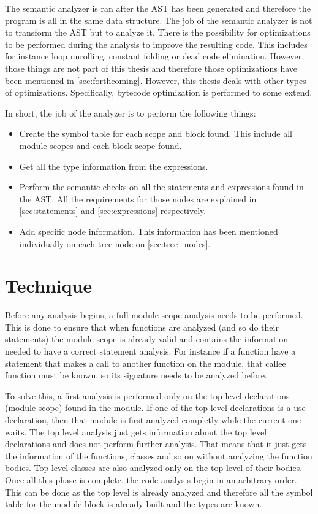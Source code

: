 The semantic analyzer is ran after the AST has been generated and therefore the program is all in
the same data structure. The job of the semantic analyzer is not to transform the AST but to analyze it.
There is the possibility for optimizations to be performed during the analysis to improve the resulting code.
This includes for instance loop unrolling, constant folding or dead code elimination. However, those things
are not part of this thesis and therefore those optimizations have been mentioned in \autoref{sec:forthcoming}.
However, this thesis deals with other types of optimizations. Specifically, bytecode optimization is performed to some extend.

In short, the job of the analyzer is to perform the following things:

\begin{itemize}
    \item Create the symbol table for each scope and block found. This include all module scopes and each block scope found.
    \item Get all the type information from the expressions.
    \item Perform the semantic checks on all the statements and expressions found in the AST. All the requirements for those nodes
        are explained in \autoref{sec:statements} and \autoref{sec:expressions} respectively.
    \item Add specific node information. This information has been mentioned individually on each tree node on \autoref{sec:tree_nodes}.
\end{itemize}

\section{Technique}

Before any analysis begins, a full module scope analysis needs to be performed. This is done to ensure that when functions are analyzed
(and so do their statements) the module scope is already valid and contains the information needed to have a correct statement analysis. For instance
if a function have a statement that makes a call to another function on the module, that callee function must be known, so its signature needs to be
analyzed before.

To solve this, a first analysis is performed only on the top level declarations (module scope) found in the module.
If one of the top level declarations is a use declaration, then that module is first analyzed completly while the current one waits.
The top level analysis just gets information about the top level declarations and does not perform further analysis.
That means that it just gets the information of the functions, classes and so on without analyzing the function bodies.
Top level classes are also analyzed only on the top level of their bodies. Once all this phase is complete, the code analysis begin in an arbitrary order.
This can be done as the top level is already analyzed and therefore all the symbol table for the module block is already built and the types are known.

